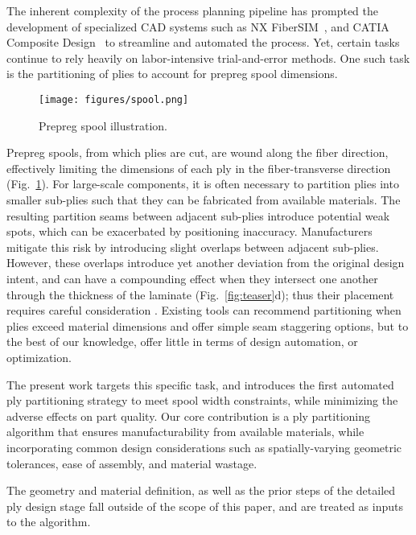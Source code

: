 The inherent complexity of the process planning pipeline has prompted the development of specialized CAD systems such as NX FiberSIM~\cite{fibersim_siemens}, and CATIA Composite Design~\cite{noauthor_catia_2023} to streamline and automated the process. Yet, certain tasks continue to rely heavily on labor-intensive trial-and-error methods. One such task is the partitioning of plies to account for prepreg spool dimensions.

\begin{figure}
    \centering
    \texttt{[image: figures/spool.png]}
    \caption{Prepreg spool illustration.}
    \label{fig:spool}
\end{figure}

Prepreg spools, from which plies are cut, are wound along the fiber direction, effectively limiting the dimensions of each ply in the fiber-transverse direction (Fig.~\ref{fig:spool}). For large-scale components, it is often necessary to partition plies into smaller sub-plies such that they can be fabricated from available materials. The resulting partition seams between adjacent sub-plies introduce potential weak spots, which can be exacerbated by positioning inaccuracy. Manufacturers mitigate this risk by introducing slight overlaps between adjacent sub-plies. However, these overlaps introduce yet another deviation from the original design intent, and can have a compounding effect when they intersect one another through the thickness of the laminate (Fig.~\ref{fig:teaser}d); thus their placement requires careful consideration \cite{mehdikhani2019voids}. Existing tools can recommend partitioning when plies exceed material dimensions and offer simple seam staggering options, but to the best of our knowledge, offer little in terms of design automation, or optimization.

The present work targets this specific task, and introduces the first automated ply partitioning strategy to meet spool width constraints, while minimizing the adverse effects on part quality. Our core contribution is a ply partitioning algorithm that ensures manufacturability from available materials, while incorporating common design considerations such as spatially-varying geometric tolerances, ease of assembly, and material wastage. 

The geometry and material definition, as well as the prior steps of the detailed ply design stage fall outside of the scope of this paper, and are treated as inputs to the algorithm.
